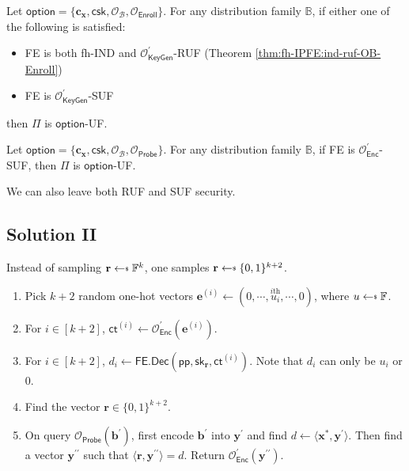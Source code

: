 \begin{theorem}
	Let $\textsf{option} = \{ \mathbf{c_x}, \textsf{csk}, \mathcal{O}_\mathcal{B}, \mathcal{O}_{\textsf{Enroll}} \}$. For any distribution family $\mathbb{B}$, if either one of the following is satisfied:
	\begin{itemize}
		\item \textsf{FE} is both fh-IND and $\mathcal{O}^\prime_{\textsf{KeyGen}}$-RUF (Theorem \ref{thm:fh-IPFE:ind-ruf-OB-Enroll})
		\item \textsf{FE} is $\mathcal{O}^\prime_{\textsf{KeyGen}}$-SUF
	\end{itemize}
then $\Pi$ is $\textsf{option}$-UF. 
\end{theorem}

\begin{theorem}
	Let $\textsf{option} = \{ \mathbf{c_x}, \textsf{csk}, \mathcal{O}_\mathcal{B}, \mathcal{O}_{\textsf{Probe}} \}$. For any distribution family $\mathbb{B}$, if \textsf{FE} is $\mathcal{O}^\prime_{\textsf{Enc}}$-SUF, then $\Pi$ is $\textsf{option}$-UF. 
\end{theorem}

We can also leave both RUF and SUF security.

\subsection{Solution II}

Instead of sampling $\mathbf{r} \getsdollar \mathbb{F}^{k}$, one samples $\mathbf{r} \getsdollar \{0, 1\}^{k+2}$.
\begin{enumerate}

	\item Pick $k+2$ random one-hot vectors $\mathbf{e}^{(i)} \gets (0, \cdots, \overset{i\text{th}}{u_i}, \cdots, 0)$, where $u \getsdollar \mathbb{F}$.

	\item For $i \in [k+2]$, $\textsf{ct}^{(i)} \gets \mathcal{O}^\prime_{\textsf{Enc}}(\mathbf{e}^{(i)})$.

	\item For $i \in [k+2]$, $d_i \gets \textsf{FE.Dec}(\textsf{pp}, \textsf{sk}_{\mathbf{r}}, \textsf{ct}^{(i)})$. Note that $d_i$ can only be $u_i$ or $0$.

	\item Find the vector $\mathbf{r} \in \{0, 1\}^{k+2}$.

	\item On query $\mathcal{O}_{\textsf{Probe}}(\mathbf{b}^\prime)$, first encode $\mathbf{b}^\prime$ into $\mathbf{y}^\prime$ and find $d \gets \langle \mathbf{x}^{*}, {\mathbf{y}^\prime} \rangle$. Then find a vector $\mathbf{y}^{\prime\prime}$ such that $\langle \mathbf{r}, {\mathbf{y}^{\prime\prime}} \rangle = d$. Return $\mathcal{O}^\prime_{\textsf{Enc}}(\mathbf{y}^{\prime\prime})$.

\end{enumerate}

